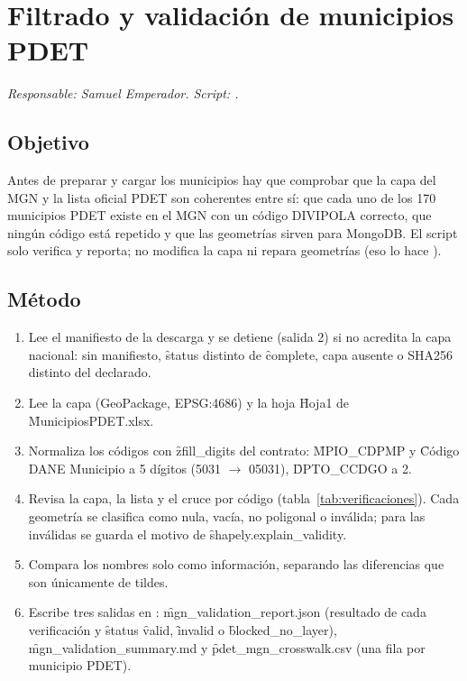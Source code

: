 \section{Filtrado y validación de municipios PDET}\label{sec:validacion}

\textit{Responsable: Samuel Emperador. Script: .}

\subsection{Objetivo}

Antes de preparar y cargar los municipios hay que comprobar que la capa del MGN y la lista oficial PDET son coherentes entre sí: que cada uno de los 170 municipios PDET existe en el MGN con un código DIVIPOLA correcto, que ningún código está repetido y que las geometrías sirven para MongoDB. El script solo verifica y reporta; no modifica la capa ni repara geometrías (eso lo hace ).

\subsection{Método}

\begin{enumerate}
  \item Lee el manifiesto de la descarga y se detiene (salida 2) si no acredita la capa nacional: sin manifiesto, \f{status} distinto de \f{complete}, capa ausente o SHA256 distinto del declarado.
  \item Lee la capa (GeoPackage, EPSG:4686) y la hoja \f{Hoja1} de \f{MunicipiosPDET.xlsx}.
  \item Normaliza los códigos con \f{zfill\_digits} del contrato: \f{MPIO\_CDPMP} y \f{Código DANE Municipio} a 5 dígitos (5031 $\rightarrow$ 05031), \f{DPTO\_CCDGO} a 2.
  \item Revisa la capa, la lista y el cruce por código (tabla~\ref{tab:verificaciones}). Cada geometría se clasifica como nula, vacía, no poligonal o inválida; para las inválidas se guarda el motivo de \f{shapely.explain\_validity}.
  \item Compara los nombres solo como información, separando las diferencias que son únicamente de tildes.
  \item Escribe tres salidas en : \f{mgn\_validation\_report.json} (resultado de cada verificación y \f{status} \f{valid}, \f{invalid} o \f{blocked\_no\_layer}), \f{mgn\_validation\_summary.md} y \f{pdet\_mgn\_crosswalk.csv} (una fila por municipio PDET).
\end{enumerate}

